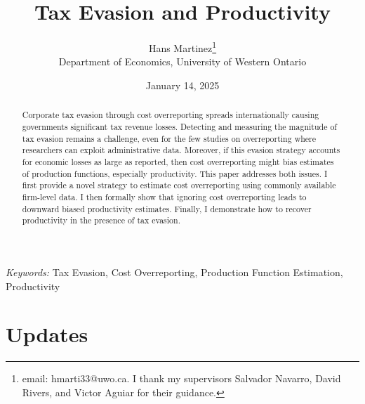 \documentclass[
  12pt]{article}
\theoremstyle{definition}
\theoremstyle{remark}
\begin{document}
\def\spacingset#1{\renewcommand{\baselinestretch}%
{#1}\small\normalsize} \spacingset{1}



\date{January 14, 2025}
\title{\bf Tax Evasion and Productivity}
\author{
Hans Martinez\thanks{email: hmarti33@uwo.ca. I thank my supervisors
Salvador Navarro, David Rivers, and Victor Aguiar for their guidance.}\\
Department of Economics, University of Western Ontario\\
}
\maketitle

\bigskip
\bigskip
\begin{abstract}
Corporate tax evasion through cost overreporting spreads internationally
causing governments significant tax revenue losses. Detecting and
measuring the magnitude of tax evasion remains a challenge, even for the
few studies on overreporting where researchers can exploit
administrative data. Moreover, if this evasion strategy accounts for
economic losses as large as reported, then cost overreporting might bias
estimates of production functions, especially productivity. This paper
addresses both issues. I first provide a novel strategy to estimate cost
overreporting using commonly available firm-level data. I then formally
show that ignoring cost overreporting leads to downward biased
productivity estimates. Finally, I demonstrate how to recover
productivity in the presence of tax evasion.
\end{abstract}

\noindent%
{\it Keywords:} Tax Evasion, Cost Overreporting, Production Function
Estimation, Productivity
\vfill

\newpage
\spacingset{1.9} %

\section*{Updates}\label{updates}
\end{document}
